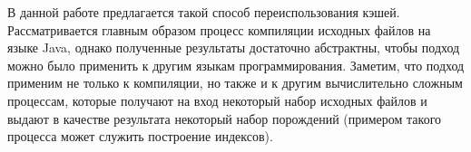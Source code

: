 В данной работе предлагается такой способ переиспользования кэшей. Рассматривается главным образом процесс компиляции исходных файлов на языке Java, однако полученные результаты достаточно абстрактны, чтобы подход можно было применить к другим языкам программирования. Заметим, что подход применим не только к компиляции, но также и к другим вычислительно сложным процессам, которые получают на вход некоторый набор исходных файлов и выдают в качестве результата некоторый набор порождений (примером такого процесса может служить построение индексов).

%